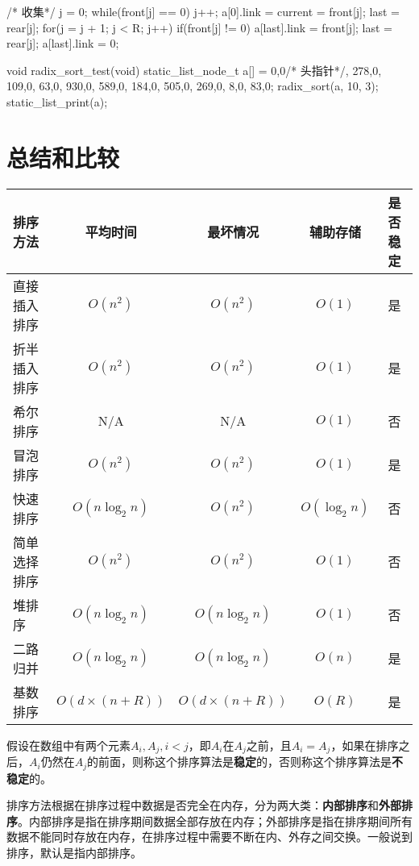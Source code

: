 \begin{Codex}[label=radix_sort.c]
{{        /* 收集*/
        j = 0;
        while(front[j] == 0) j++;
        a[0].link = current = front[j];
        last = rear[j];
        for(j = j + 1; j < R; j++) {
            if(front[j] != 0) {
                a[last].link = front[j];
                last = rear[j];
            }
        }
        a[last].link = 0;
    }
}

void radix_sort_test(void) {
    static_list_node_t a[] = {{0,0}/* 头指针*/, {278,0}, {109,0}, 
    {63,0}, {930,0}, {589,0}, {184,0}, {505,0}, {269,0}, 
    {8,0}, {83,0}};
    radix_sort(a, 10, 3);
    static_list_print(a);
}
\end{Codex}


\section{总结和比较} %

\begin{center}

\vspace{1ex}
\begin{tabular}{lcccc}
\hline
\textbf{排序方法} & \textbf{平均时间} & \textbf{最坏情况} & \textbf{辅助存储} & \textbf{是否稳定}\\
\hline
直接插入排序 & $O(n^2)$ & $O(n^2)$ & $O(1)$ & 是\\
折半插入排序 & $O(n^2)$ & $O(n^2)$ & $O(1)$ & 是\\
希尔排序 & N/A & N/A & $O(1)$ & 否\\
冒泡排序 & $O(n^2)$ & $O(n^2)$ & $O(1)$ & 是\\
快速排序 & $O(n\log_2n)$ & $O(n^2)$ & $O(\log_2n)$ & 否\\
简单选择排序 & $O(n^2)$ & $O(n^2)$ & $O(1)$ & 否\\
堆排序 & $O(n\log_2n)$ & $O(n\log_2n)$ & $O(1)$ & 否\\
二路归并 & $O(n\log_2n)$ & $O(n\log_2n)$ & $O(n)$ & 是\\
基数排序 & $O(d\times (n+R))$ & $O(d\times (n+R))$ & $O(R)$ & 是\\
\hline
\end{tabular}
\end{center}

假设在数组中有两个元素$A_i,A_j,i<j$，即$A_i$在$A_j$之前，且$A_i=A_j$，如果在排序之后，$A_i$仍然在$A_j$的前面，则称这个排序算法是\textbf{稳定}的，否则称这个排序算法是\textbf{不稳定}的。

排序方法根据在排序过程中数据是否完全在内存，分为两大类：\textbf{内部排序}和\textbf{外部排序}。内部排序是指在排序期间数据全部存放在内存；外部排序是指在排序期间所有数据不能同时存放在内存，在排序过程中需要不断在内、外存之间交换。一般说到排序，默认是指内部排序。

